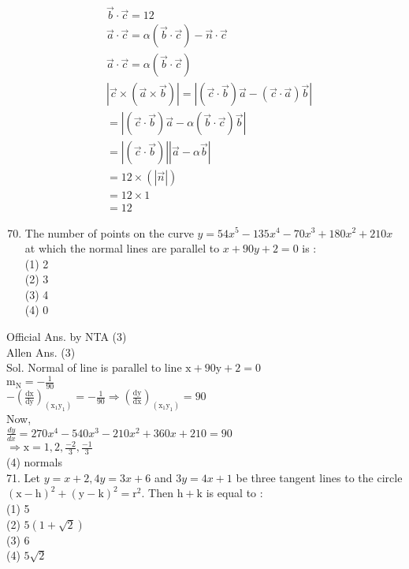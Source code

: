 \documentclass[10pt]{article}
\begin{document}
\[
\begin{aligned}
& \vec{b} \cdot \vec{c}=12 \\
& \vec{a} \cdot \vec{c}=\alpha(\vec{b} \cdot \vec{c})-\vec{n} \cdot \vec{c} \\
& \vec{a} \cdot \vec{c}=\alpha(\vec{b} \cdot \vec{c}) \\
&|\vec{c} \times(\vec{a} \times \vec{b})|=|(\vec{c} \cdot \vec{b}) \vec{a}-(\vec{c} \cdot \vec{a}) \vec{b}| \\
&=|(\vec{c} \cdot \vec{b}) \vec{a}-\alpha(\vec{b} \cdot \vec{c}) \vec{b}| \\
&=|(\vec{c} \cdot \vec{b})||\vec{a}-\alpha \vec{b}| \\
&= 12 \times(|\vec{n}|) \\
&= 12 \times 1 \\
&= 12
\end{aligned}
\]

\begin{enumerate}
  \setcounter{enumi}{69}
  \item The number of points on the curve \(y=54 x^{5}- 135 x^{4}-70 x^{3}+180 x^{2}+210 x\) at which the normal lines are parallel to \(x+90 y+2=0\) is :\\
(1) 2\\
(2) 3\\
(3) 4\\
(4) 0
\end{enumerate}

Official Ans. by NTA (3)\\
Allen Ans. (3)\\
Sol. Normal of line is parallel to line \(\mathrm{x}+90 \mathrm{y}+2=0\)\\
\(\mathrm{m}_{\mathrm{N}}=-\frac{1}{90}\)\\
\(-\left(\frac{\mathrm{dx}}{\mathrm{dy}}\right)_{\left(\mathrm{x}_{1} \mathrm{y}_{1}\right)}=-\frac{1}{90} \Rightarrow\left(\frac{\mathrm{dy}}{\mathrm{dx}}\right)_{\left(\mathrm{x}_{1} \mathrm{y}_{1}\right)}=90\)\\
Now,\\
\(\frac{d y}{d x}=270 x^{4}-540 x^{3}-210 x^{2}+360 x+210=90\)\\
\(\Rightarrow \mathrm{x}=1,2, \frac{-2}{3}, \frac{-1}{3}\)\\
(4) normals\\
71. Let \(y=x+2,4 y=3 x+6\) and \(3 y=4 x+1\) be three tangent lines to the circle \((\mathrm{x}-\mathrm{h})^{2}+(\mathrm{y}-\mathrm{k})^{2}=\mathrm{r}^{2}\). Then \(\mathrm{h}+\mathrm{k}\) is equal to :\\
(1) 5\\
(2) \(5(1+\sqrt{2})\)\\
(3) 6\\
(4) \(5 \sqrt{2}\)
\end{document}
